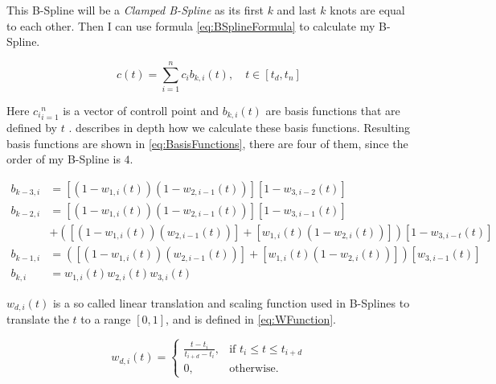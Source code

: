 \documentclass[a4paper,12pt]{extarticle}
\begin{document}
This B-Spline will be a \emph{Clamped B-Spline} as its first $k$ and last $k$ knots are equal to each other. Then I can use formula \cref{eq:BSplineFormula} to calculate my B-Spline.

\begin{equation}
c(t)= \sum_{i=1}^{n} c_i b_{k,i}(t), \quad t \in \left[t_d,t_n\right]
\label{eq:BSplineFormula}
\end{equation}

Here ${c_i}_{i=1}^n$ is a vector of controll point and $b_{k,i}(t)$ are basis functions that are defined by $t$ \citep[Chap 5.5.1]{Laksa2012}. \citep[Chap 5.5.3]{Laksa2012} describes in depth how we calculate these basis functions. Resulting basis functions are shown in \cref{eq:BasisFunctions}, there are four of them, since the order of my B-Spline is $4$.

\begin{equation}
\begin{split}
b_{k-3,i} &= \left[ \left( 1-w_{1,i}(t) \right) \left( 1-w_{2,i-1}(t) \right) \right] \left[ 1-w_{3,i-2}(t) \right]\\
b_{k-2,i} &= \left[ \left( 1-w_{1,i}(t) \right) \left( 1-w_{2,i-1}(t) \right) \right] \left[ 1-w_{3,i-1}(t) \right]\\ &+ \left( \left[ \left( 1-w_{1,i}(t) \right) \left( w_{2,i-1}(t) \right) \right] + \left[ w_{1,i}(t) \left( 1-w_{2,i}(t) \right) \right] \right) \left[ 1-w_{3,i-t}(t) \right]\\
b_{k-1,i} &= \left( \left[ \left( 1-w_{1,i}(t) \right) \left( w_{2,i-1}(t) \right) \right] + \left[ w_{1,i}(t) \left( 1-w_{2,i}(t) \right) \right] \right) \left[ w_{3,i-1}(t) \right]\\
b_{k,i} &= w_{1,i}(t) w_{2,i}(t) w_{3,i}(t)
\label{eq:BasisFunctions}
\end{split}
\end{equation}

$w_{d,i}(t)$ is a so called linear translation and scaling function used in B-Splines to translate the $t$ to a range $[0,1]$, and is defined in \cref{eq:WFunction}.

\begin{equation}
  w_{d,i}(t) = 		
  \begin{cases}
    \frac{t-t_i}{t_{i+d} - t_i}, & \text{if } t_i \leq t \leq t_{i+d}\\
    0, & \text{otherwise.}
  \end{cases}
  \label{eq:WFunction}
\end{equation}
\end{document}
